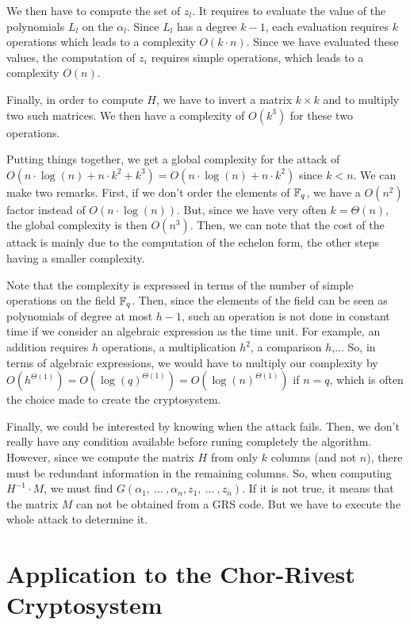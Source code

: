 \documentclass[a4paper]{article}
\begin{document}
We then have to compute the set of $z_l$. It requires to evaluate the value of the polynomials $L_l$ on the $\alpha_l$. Since $L_l$ has a degree $k-1$, each evaluation requires $k$ operations which
leads to a complexity $O(k \cdot n)$. Since we have evaluated these values, the computation of $z_i$ requires simple operations, which leads to a complexity $O(n)$.

Finally, in order to compute $H$, we have to invert a matrix $k\times k$ and to multiply two such matrices. We then have a complexity of $O(k^{3})$ for these two operations.

Putting things together, we get a global complexity for the attack of $O(n \cdot \log(n) + n \cdot k^{2} + k^{3}) = O(n \cdot \log(n) + n \cdot k^{2})$ since $k<n$. We can make two remarks. First, if we don't
order the elements of $\mathbb{F}_q$, we have a $O(n^{2})$ factor instead of $O(n \cdot \log(n))$. But, since we have very often $k=\varTheta(n)$, the global complexity is then $O(n^{3})$. Then, we can note that
the cost of the attack is mainly due to the computation of the echelon form, the other steps having a smaller complexity.

Note that the complexity is expressed in terms of the number of simple operations on the field $\mathbb{F}_q$. Then, since the elements of the field can be seen as polynomials of degree at most
$h-1$, such an operation is not done in constant time if we consider an algebraic expression as the time unit. For example, an addition requires $h$ operations, a multiplication $h^{2}$, a comparison
$h$,... So, in terms of algebraic expressions, we would have to multiply our complexity by $O(h^{\varTheta(1)}) = O(\log(q)^{\varTheta(1)}) = O(\log(n)^{\varTheta(1)})$ if $n=q$, which is often the choice made to
create the cryptosystem.

Finally, we could be interested by knowing when the attack fails. Then, we don't really have any condition available before runing completely the algorithm.
However, since we compute the matrix $H$ from only $k$ columns (and not $n$), there must be redundant information in the remaining columns. So, when computing $H^{-1} \cdot M$, we must find $G(\alpha_1, \ ... \ , \alpha_n, z_1, \ ... \ , z_n)$.
If it is not true, it means that the matrix $M$ can not be obtained from a GRS code. But we have to execute the whole attack to determine it.



\section{Application to the Chor-Rivest Cryptosystem}
\label{sec:CRcrypt}
\end{document}
